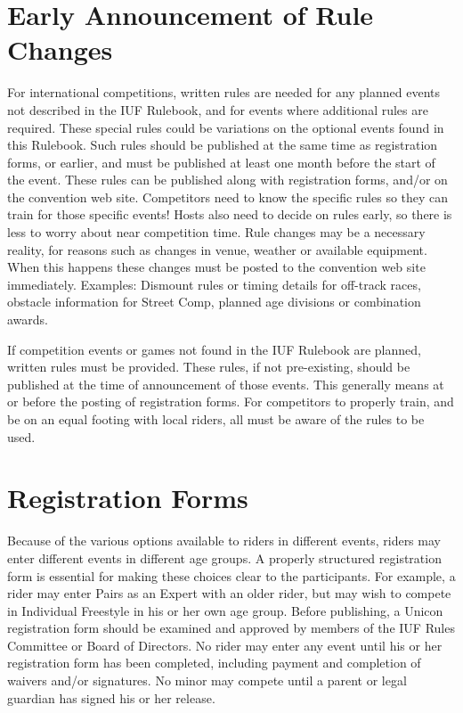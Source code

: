 \section{Early Announcement of Rule Changes}
For international competitions, written rules are needed for any planned events not described in the IUF Rulebook, and for events where additional rules are required. 
These special rules could be variations on the optional events found in this Rulebook. 
Such rules should be published at the same time as registration forms, or earlier, and must be published at least one month before the start of the event. 
These rules can be published along with registration forms, and/or on the convention web site. 
Competitors need to know the specific rules so they can train for those specific events! 
Hosts also need to decide on rules early, so there is less to worry about near competition time. 
Rule changes may be a necessary reality, for reasons such as changes in venue, weather or available equipment. 
When this happens these changes must be posted to the convention web site immediately. 
Examples: Dismount rules or timing details for off-track races, obstacle information for Street Comp, planned age divisions or combination awards.

If competition events or games not found in the IUF Rulebook are planned, written rules must be provided. 
These rules, if not pre-existing, should be published at the time of announcement of those events. 
This generally means at or before the posting of registration forms. 
For competitors to properly train, and be on an equal footing with local riders, all must be aware of the rules to be used.

\section{Registration Forms}
Because of the various options available to riders in different events, riders may enter different events in different age groups.
A properly structured registration form is essential for making these choices clear to the participants.
For example, a rider may enter Pairs as an Expert with an older rider, but may wish to compete in Individual Freestyle in his or her own age group.
Before publishing, a Unicon registration form should be examined and approved by members of the IUF Rules Committee or Board of Directors.
No rider may enter any event until his or her registration form has been completed, including payment and completion of waivers and/or signatures.
No minor may compete until a parent or legal guardian has signed his or her release.

